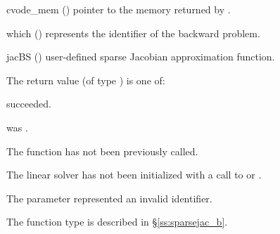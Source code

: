 {
  \begin{args}
  \item[cvode\_mem] ()
    pointer to the {\cvodes} memory returned by .
  \item[which] ()
    represents the identifier of the backward problem.
  \item[jacBS] ()
    user-defined sparse Jacobian approximation function.
  \end{args}
}
{
  The return value  (of type ) is one of:
  \begin{args}
  \item[\Id{CVSLS\_SUCCESS}] 
     succeeded.
  \item[\Id{CVSLS\_MEM\_NULL}]
     was .
  \item[\Id{CVSLS\_NO\_ADJ}]
    The function  has not been previously called.
  \item[\Id{CVSLS\_LMEM\_NULL}]
    The linear solver has not been initialized with a call to 
    or .
  \item[\Id{CVSLS\_ILL\_INPUT}]
    The parameter  represented an invalid identifier.
  \end{args}
}
{
  The function type  is described in \S\ref{ss:sparsejac_b}.
}


